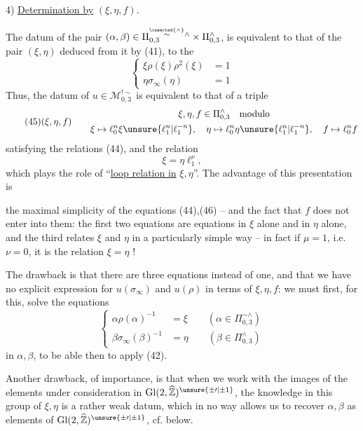 4) \uline{Determination by} $(\xi,\eta,f)$.

The datum of the pair $(\alpha,\beta)\in\Pi_{0,3}^{\overset{\inserted{\wedge}}{\sim}\wedge}\times\Pi_{0,3}^{\wedge}$, is equivalent to that of the pair $(\xi,\eta)$ deduced from it by (41),  to the 
\[
\tag{44}
\boxed{\left\{\begin{aligned}
\xi\rho(\xi)\rho^2(\xi)&=1\\
\eta\sigma_\infty(\eta)&=1
\end{aligned}\right.}
\]
Thus, the datum of $u\in\mathcal{M}_{0,3}^{!\sim}$ is equivalent to that of a triple
\[
\tag{45}
(\xi,\eta,f)\qquad
\begin{gathered}
\xi,\eta,f\in\Pi_{0,3}^{\wedge}\quad\text{modulo}\\
\xi\mapsto\ell_0^n\xi\unsure{\ell_1^n|\ell_1^{-n}},\quad
\eta\mapsto\ell_0^n\eta\unsure{\ell_1^n|\ell_1^{-n}},\quad
f\mapsto\ell_0^n f
\end{gathered}
\]
satisfying the relations (44), and the relation
\[
\tag*{(46)=(43)}
\boxed{\xi=\eta\ell_1^\nu},
\]
which plays the role of ``\uline{loop relation in} $\xi,\eta$''. The advantage of this presentation is


the maximal simplicity of the equations (44),(46) -- and the fact that $f$ does not enter into them:  the first two equations are equations in $\xi$ alone and in $\eta$ alone, and the third relates $\xi$ and $\eta$ in a particularly simple way -- in fact if $\mu=1$, i.e. $\nu=0$, it is the relation $\xi=\eta$ !

The drawback is that there are three equations instead of one, and that we have no explicit expression for $u(\sigma_\infty)$ and $u(\rho)$ in terms of $\xi,\eta,f$: we must first, for this, solve the equations
\[
\tag{47}
\left\{\begin{aligned}
\alpha\rho(\alpha)^{-1}&=\xi\qquad(\alpha\in\Pi_{0,3}^{\sim\wedge})\\
\beta\sigma_\infty(\beta)^{-1}&=\eta\qquad(\beta\in\Pi_{0,3}^{\wedge})
\end{aligned}\right.
\]
in $\alpha,\beta$, to be able then to apply (42).

Another \inserted{[!]} drawback, of importance, is that when we work with the images of the elements under consideration in $\mathrm{Gl}(2,\widehat{\mathbb Z})^{\unsure{\pm\prime|\pm1}}$, the knowledge in this group of $\xi,\eta$  is  a rather weak datum, which in no way allows us to recover $\alpha,\beta$ as elements of $\mathrm{Gl}(2,\widehat{\mathbb Z})^{\unsure{\pm\prime|\pm1}}$, cf. below.

